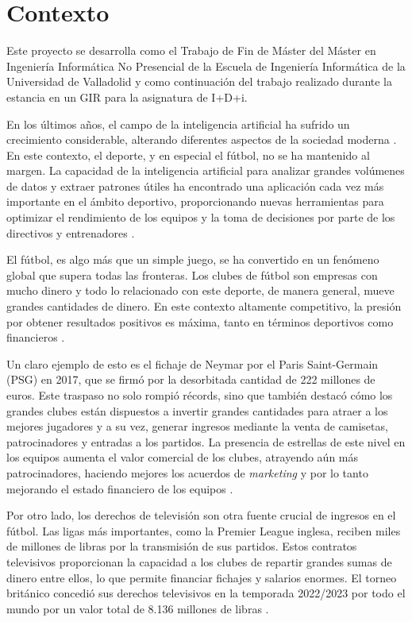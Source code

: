 


\section{Contexto}
Este proyecto se desarrolla como el Trabajo de Fin de Máster del Máster en Ingeniería Informática No Presencial de la Escuela de Ingeniería Informática de la Universidad de Valladolid y como continuación del trabajo realizado durante la estancia en un GIR para la asignatura de I+D+i.

En los últimos años, el campo de la inteligencia artificial ha sufrido un crecimiento considerable, alterando diferentes aspectos de la sociedad moderna \cite{ia2}. En este contexto, el deporte, y en especial el fútbol, no se ha mantenido al margen. La capacidad de la inteligencia artificial para analizar grandes volúmenes de datos y extraer patrones útiles ha encontrado una aplicación cada vez más importante en el ámbito deportivo, proporcionando nuevas herramientas para optimizar el rendimiento de los equipos y la toma de decisiones por parte de los directivos y entrenadores \cite{ia1}.

El fútbol, es algo más que un simple juego, se ha convertido en un fenómeno global que supera todas las fronteras. Los clubes de fútbol son empresas con mucho dinero y todo lo relacionado con este deporte, de manera general, mueve grandes cantidades de dinero. En este contexto altamente competitivo, la presión por obtener resultados positivos es máxima, tanto en términos deportivos como financieros \cite{dinero}. 

Un claro ejemplo de esto es el fichaje de Neymar por el Paris Saint-Germain (PSG) en 2017, que se firmó por la desorbitada cantidad de 222 millones de euros. Este traspaso no solo rompió récords, sino que también destacó cómo los grandes clubes están dispuestos a invertir grandes cantidades para atraer a los mejores jugadores y a su vez, generar ingresos mediante la venta de camisetas, patrocinadores y entradas a los partidos. La presencia de estrellas de este nivel en los equipos aumenta el valor comercial de los clubes, atrayendo aún más patrocinadores, haciendo mejores los acuerdos de \textit{marketing} y por lo tanto mejorando el estado financiero de los equipos \cite{neymar}.

Por otro lado, los derechos de televisión son otra fuente crucial de ingresos en el fútbol. Las ligas más importantes, como la Premier League inglesa, reciben miles de millones de libras por la transmisión de sus partidos. Estos contratos televisivos proporcionan la capacidad a los clubes de repartir grandes sumas de dinero entre ellos, lo que permite financiar fichajes y salarios enormes. El torneo británico concedió sus derechos televisivos en la temporada 2022/2023 por todo el mundo por un valor total de 8.136 millones de libras \cite{premier-tv}.

